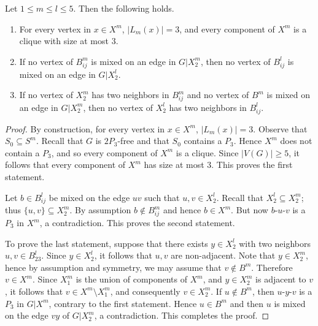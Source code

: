 \documentclass[11pt]{article}
\begin{document}
\begin{claim}\label{clm:P3(2.5)} Let $1\leq m\leq l\leq 5$. Then the following holds.
	\begin{enumerate}
		\item For every vertex in $x\in X^m$, $|L_m(x)|=3$, and every component of $X^m$ is a clique with size at most $3$.
		\item If no vertex of $B_{ij}^m$ is mixed on an edge in $G|X^m_2$, then no vertex of $B_{ij}^l$ is mixed on an edge in $G|X_2^l$.
		\item If no vertex of $X^m_2$ has two neighbors in $B^m_{ij}$ and no vertex of $B^m$ is mixed on an edge in $G|X^m_2$, then no vertex of $X^l_2$ has two neighbors in $B_{ij}^l$.
	\end{enumerate}
	
\end{claim}
\begin{proof}
	By construction, for every vertex in $x\in X^m$, $|L_m(x)|=3$. Observe that $S_0\subseteq S^m$. Recall that $G$ is $2P_3$-free and that $S_0$ contains a $ P_3 $. Hence $X^m$ does not contain a $P_3$, and so every component of $X^m$ is a clique. Since $|V(G)|\geq 5$, it follows that every component of $X^m$ has size at most $ 3 $. This proves the first statement.
	
	Let $b\in B_{ij}^l$ be mixed on the edge $uv$ such that $u,v\in X_2^l$. Recall that $ X_2^l\subseteq X_2^m$; thus $\{u,v\}\subseteq X_2^m$. By assumption $b\not \in B_{ij}^m$ and hence $b\in X^m$. But now $b$-$u$-$v$ is a $P_3$ in $X^m$, a contradiction. This proves the second statement.
	
	To prove the last statement, suppose that there exists $y\in X_2^l$ with two neighbors $u,v\in B_{23}^l$. Since $y\in X_2^l$, it follows that $u,v$ are non-adjacent. Note that $y\in X_2^m$, hence by assumption and symmetry, we may assume that $v\notin B^m$. Therefore $v\in X^m$. Since $X_1^m$ is the union of components of $X^m$, and $y\in X_2^m$ is adjacent to $v$, it follows that $v\in X^m\setminus X_1^m$, and consequently $v\in X_2^m$. If $u\notin B^m$, then $u$-$y$-$v$ is a $P_3$ in $G|X^m$, contrary to the first statement.  Hence $u\in B^m$  and then $u$ is mixed on the edge $vy$ of $ G|X^m_2$, a contradiction. This completes the proof.
\end{proof}
\end{document}
